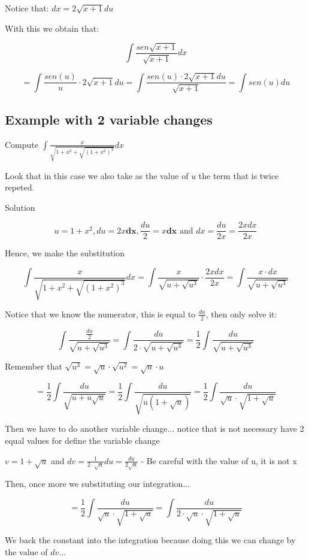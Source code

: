 \documentclass{article}
\begin{document}
Notice that:
\(dx = 2\sqrt{x+1} du\)

With this we obtain that:

\[
\int \frac{sen \sqrt{x+1}}{\sqrt{x+1}}
dx\]

\[
=\int \frac{sen(u)}{u} \cdot 2\sqrt{x+1} du 
= \int \frac{sen(u) \cdot 2\sqrt{x+1} du}{\sqrt{x+1}} 
= \int sen(u) du
\]

\subsection*{Example with 2 variable changes}
Compute \(\int \frac{x}{\sqrt{1+x^2+\sqrt{(1+x^2)^3}}} dx\)

Look that in this case we also take as the value of \(u\) the term that is twice repeted.

Solution

\[u = 1+x^2, du = 2x \textbf{dx},  \frac{du}{2} = x \textbf{dx} \text{ and } dx= \frac{du}{2x} = \frac{2x dx}{2x}\]


Hence, we make the substitution

\[
\int \frac{x}{\sqrt{1+x^2+\sqrt{(1+x^2)^3}}} dx = \int \frac{x}{\sqrt{u+\sqrt{u^3}}} \cdot \frac{2x dx}{2x} = \int \frac{x\cdot dx}{\sqrt{u+\sqrt{u^3}}}
\]

Notice that we know the numerator, this is equal to \(\frac{du}{2}\), then only solve it:

\[ \int \frac{\frac{du}{2}}{\sqrt{u+\sqrt{u^3}}} = \int \frac{du}{2 \cdot \sqrt{u+\sqrt{u^3}}} = \frac{1}{2} \int \frac{du}{\sqrt{u + \sqrt{u^3}}}\]

Remember that \(\sqrt{u^3} = \sqrt{u}\cdot \sqrt{u^2} = \sqrt{u}\cdot u\)

\[
= \frac{1}{2} \int \frac{du}{\sqrt{u+u\sqrt{u}}} = \frac{1}{2} \int \frac{du}{\sqrt{u(1+\sqrt{u})}} = \frac{1}{2} \int \frac{du}{\sqrt{u} \cdot \sqrt{1+ \sqrt{u}}}
\]

Then we have to do another variable change... notice that is not necessary have 2 equal values for define the variable change

\(v = 1+\sqrt{u}\) and \(dv = \frac{1}{2\cdot \sqrt{u}} du = \frac{du}{2\sqrt{u}} \) - Be careful with the value of u, it is not x

Then, once more we substituting our integration...

\[= \frac{1}{2} \int \frac{du}{\sqrt{u} \cdot \sqrt{1+ \sqrt{u}}} = \int \frac{du}{2\cdot \sqrt{u} \cdot \sqrt{1+\sqrt{u}}}
\]

We back the constant into the integration because doing this we can change by the value of \(dv\)...
\end{document}

